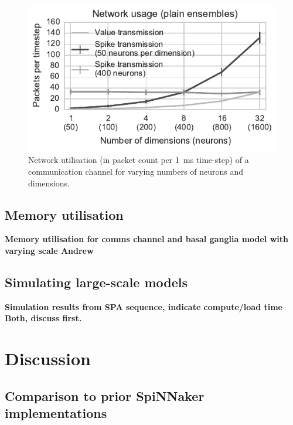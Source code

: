 \documentclass[conference]{IEEEtran}
\begin{document}
  \begin{figure}[!t]
    \includegraphics{figures/network-1}
    \caption{Network utilisation (in packet count per \SI{1}{\milli\second} time-step) of a communication channel for varying numbers of neurons and dimensions.}
    \label{fig:results/network-utilisation}
  \end{figure}


  \subsection{Memory utilisation}

  \textbf{Memory utilisation for comms channel and basal ganglia model with varying scale \color{red} Andrew}

  \subsection{Simulating large-scale models}
  \label{sec:spa-sequence}

  \textbf{Simulation results from SPA sequence, indicate compute/load time \color{red} Both, discuss first.}

  \section{Discussion}

  \subsection{Comparison to prior SpiNNaker implementations}
\end{document}
